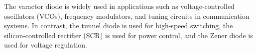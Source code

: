 The varactor diode is widely used in applications such as voltage-controlled oscillators (VCOs), frequency modulators, and tuning circuits in communication systems. In contrast, the tunnel diode is used for high-speed switching, the silicon-controlled rectifier (SCR) is used for power control, and the Zener diode is used for voltage regulation.

